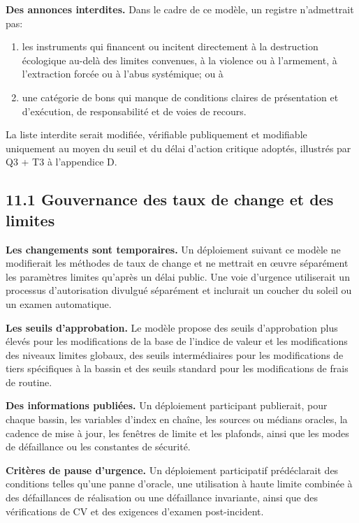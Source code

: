 \documentclass[11pt]{article}
\begin{document}
\textbf{Des annonces interdites.} Dans le cadre de ce modèle, un registre n'admettrait pas:

\begin{enumerate}[leftmargin=*]
\item les instruments qui financent ou incitent directement à la destruction écologique au-delà des limites convenues, à la violence ou à l'armement, à l'extraction forcée ou à l'abus systémique; ou à
\item une catégorie de bons qui manque de conditions claires de présentation et d'exécution, de responsabilité et de voies de recours.
\end{enumerate}
La liste interdite serait modifiée, vérifiable publiquement et modifiable uniquement au moyen du seuil et du délai d'action critique adoptés, illustrés par Q3 + T3 à l'appendice D.

\subsection*{11.1 Gouvernance des taux de change et des limites}

\textbf{Les changements sont temporaires.} Un déploiement suivant ce modèle ne modifierait les méthodes de taux de change et ne mettrait en œuvre séparément les paramètres limites qu'après un délai public. Une voie d'urgence utiliserait un processus d'autorisation divulgué séparément et inclurait un coucher du soleil ou un examen automatique.

\textbf{Les seuils d'approbation.} Le modèle propose des seuils d'approbation plus élevés pour les modifications de la base de l'indice de valeur et les modifications des niveaux limites globaux, des seuils intermédiaires pour les modifications de tiers spécifiques à la bassin et des seuils standard pour les modifications de frais de routine.

\textbf{Des informations publiées.} Un déploiement participant publierait, pour chaque bassin, les variables d'index en chaîne, les sources ou médians oracles, la cadence de mise à jour, les fenêtres de limite et les plafonds, ainsi que les modes de défaillance ou les constantes de sécurité.

\textbf{Critères de pause d'urgence.} Un déploiement participatif prédéclarait des conditions telles qu'une panne d'oracle, une utilisation à haute limite combinée à des défaillances de réalisation ou une défaillance invariante, ainsi que des vérifications de CV et des exigences d'examen post-incident.
\end{document}
